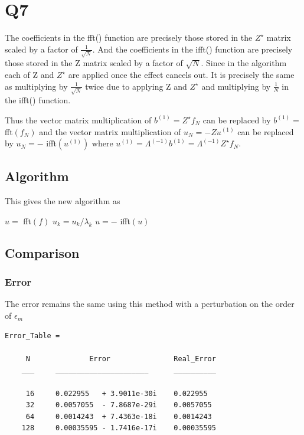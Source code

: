 \documentclass{article}
\begin{document}
\newpage
\section{Q7}

The coefficients in the fft() function are precisely those stored in the $Z^\star$ matrix scaled by a factor of $\frac{1}{\sqrt{N}}$. And the coefficients in the ifft() function are precisely those stored in the Z matrix scaled by a factor of $\sqrt{N}$. Since in the algorithm each of Z and $Z^\star$ are applied once the effect cancels out. It is precisely the same as multiplying by $\frac{1}{\sqrt{N}}$ twice due to applying Z and $Z^\star$ and multiplying by $\frac{1}{N}$ in the ifft() function.

Thus the vector matrix multiplication of $ b^{(1)} = Z^\star f_N $ can be replaced by $b^{(1)} =$ fft$(f_N)$ and the vector matrix multiplication of $ u_N = - Z u^{(1)} $ can be replaced by $u_N = -$ ifft$(u^{(1)})$ where $u^{(1)} = \Lambda^{(-1)} b^{(1)} = \Lambda^{(-1)} Z^\star f_N$.

\subsection{Algorithm}
This gives the new algorithm as

\begin{algorithmic}
	\State $u = $ fft$(f)$
		\State $u_k = u_k / \lambda_k$
	\EndFor
	\State $u = -$ ifft$(u)$
\end{algorithmic}

\subsection{Comparison}

\subsubsection{Error}

The error remains the same using this method with a perturbation on the order of $\epsilon_m$

\begin{verbatim}
Error_Table = 

     N              Error               Real_Error
    ___     ______________________      __________

     16     0.022955   + 3.9011e-30i    0.022955
     32     0.0057055  - 7.8687e-29i    0.0057055
     64     0.0014243  + 7.4363e-18i    0.0014243
    128     0.00035595 - 1.7416e-17i    0.00035595
\end{verbatim}
\end{document}

